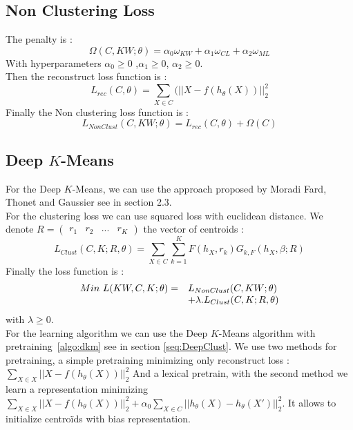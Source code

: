 \subsection{Non Clustering Loss}
The penalty is :
\begin{equation}\label{eq:Sparse}
  \Omega(C,KW;\theta) = \alpha_0\omega_{KW} + \alpha_1\omega_{CL} + \alpha_2\omega_{ML}  
\end{equation}
With hyperparameters $\alpha_0\geq 0$ ,$\alpha_1\geq 0$, $\alpha_2\geq 0$.
\\Then the reconstruct loss function is :
\begin{equation}\label{eq:AEDK}
  L_{rec}(C, \theta) = \sum\limits_{X \in C}(||X - f(h_\theta(X))||_2^2
\end{equation}
Finally the Non clustering loss function is :
\begin{equation}\label{eq:AE}
  L_{NonClust}(C,KW; \theta) = L_{rec}(C, \theta) + \Omega(C)  
\end{equation}

\subsection{Deep $K$-Means}

For the Deep $K$-Means, we can use the approach proposed by Moradi Fard, Thonet and Gaussier 
\cite{Deap-K-Means} see in section 2.3.\\
For the clustering loss we can use squared loss with euclidean distance. We
denote $R = \begin{pmatrix} r_1 & r_2 & ... & r_K\end{pmatrix}$ the vector of
centroids :  
\begin{equation}\label{eq:loss_clust}
  L_{Clust}(C, K;R, \theta) = \sum\limits_{X \in C}\sum\limits_{k=1}^K F(h_X, r_k) G_{k, F}(h_X, \beta; R) 
\end{equation}
Finally the loss function is :
\begin{equation}\label{eq:loss_FINALE}
\begin{array}{l l}
  Min~L(KW, C, K; \theta) = & L_{NonClust}(C, KW; \theta) \\
  & + \lambda.L_{Clust}(C, K;R, \theta)
\end{array}
\end{equation}
with $\lambda \geq 0$.\\
For the learning algorithm we can use the Deep $K$-Means algorithm with 
pretraining~\ref{algo:dkm} see in section \ref{seq:DeepClust}. We use two 
methods for pretraining, a simple pretraining minimizing only reconstruct loss :
$\sum\limits_{X \in X} || X - f(h_\theta(X))||_2^2$
And a lexical pretrain, with the second method we learn a representation 
minimizing $\sum\limits_{X \in X} || X - f(h_\theta(X))||_2^2 + 
\alpha_0 \sum\limits_{X \in C} || h_\theta(X) - h_\theta(X')||_2^2$. 
It allows to initialize centroïds with bias  representation.
